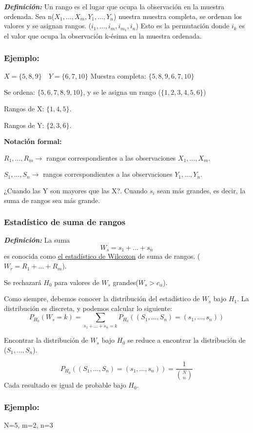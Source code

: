 \textbf{\textit{Definición:}} Un rango es el lugar que ocupa la observación en la muestra ordenada.
Sea n($X_1,\dots,X_m,Y_1,\dots,Y_n$) nuestra muestra completa, se ordenan los valores y se asignan rangos.
($i_1,\dots,i_m,i_{m_1},i_n$)
Esto es la permutación donde $i_k$ es el valor que ocupa la observación k-ésima en la muestra ordenada.

\subsubsection*{Ejemplo:}
\(
X=\{5,8,9\} \quad Y=\{6,7,10\}
\)
Muestra completa: $\{5,8,9,6,7,10\}$

Se ordena: $\{5,6,7,8,9,10\}$, y se le asigna un rango ($\{1,2,3,4,5,6\}$)

Rangos de X: $\{1,4,5\}$.

Rangos de Y: $\{2,3,6\}$.

\textbf{Notación formal:}

$R_1,\dots,R_m \longrightarrow$ rangos correspondientes a las observaciones $X_1,\dots,X_m$.

$S_1,\dots,S_n \longrightarrow$ rangos correspondientes a las observaciones $Y_1,\dots,Y_n$.

¿Cuando las Y son mayores que las X?. Cuando $s_i$ sean más grandes, es decir, la suma de rangos sea más grande.

\subsubsection{Estadístico de suma de rangos}
\textit{\textbf{Definición: }} La suma
\[
W_s=s_1+\dots+s_n
\]
es conocida como
\href{https://es.wikipedia.org/wiki/Prueba_de_los_rangos_con_signo_de_Wilcoxon}{el estadístico de Wilcoxon}
de suma de rangos. ($W_r=R_1+\dots+R_m$).

Se rechazará $H_0$ para valores de $W_s$ grandes($W_s>c_\alpha$).

Como siempre, debemos conocer la distribución del estadístico de $W_s$ bajo $H_1$.
La distribución es discreta, y podemos calcular lo siguiente:
\[
P_{H_0}(W_s=k)=\sum_{s_1+\dots+s_n=k} P_{H_0} ((S_1,\dots,S_n)=(s_1,\dots,s_n))
\]

Encontrar la distribución de $W_s$ bajo $H_0$ se reduce a encontrar la distribución de ($S_1,\dots,S_n$).

\[
P_{H_0} ((S_1,\dots,S_n)=(s_1,\dots,s_n))=\frac{1}{\binom{N}{n}}
\]
Cada resultado es igual de probable bajo $H_0$.

\subsubsection*{Ejemplo:}
N=5, m=2, n=3

